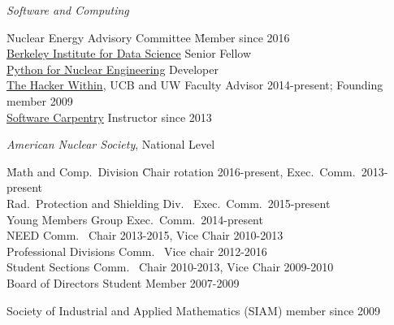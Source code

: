 \vspace*{-.5em}
\textit{Software and Computing}
\begin{tabbing}
\hspace*{2 em}\= Nuclear Energy Advisory Committee \hspace*{3em} \= Member since 2016\\
%
\>\href{http://bids.berkeley.edu/}{Berkeley Institute for Data Science} \> Senior Fellow\\
%
\> \href{http://pyne.io/}{Python for Nuclear Engineering}  \> Developer \\
%
\> \href{http://thehackerwithin.github.io/berkeley/}{The Hacker Within}, UCB and UW  \> Faculty Advisor 2014-present; Founding member 2009\\
%
\> \href{http://software-carpentry.org/}{Software Carpentry}  \> Instructor since 2013%
%
\end{tabbing}
%
\textit{American Nuclear Society}, National Level
\begin{tabbing}
\hspace*{2 em}\= Math and Comp.\ Division \hspace*{6em} \= Chair rotation 2016-present, Exec.\ Comm.\ 2013-present \\
%
\> Rad.\ Protection and Shielding Div.\ \> Exec.\ Comm.\ 2015-present\\
%
\> Young Members Group \> Exec.\ Comm.\ 2014-present\\
%
\> NEED Comm.\ \> Chair 2013-2015, Vice Chair 2010-2013\\
%
\> Professional Divisions Comm.\ \>	Vice chair 2012-2016 \\
%
\> Student Sections Comm.\ \> Chair 2010-2013, Vice Chair 2009-2010\\
%
%
\> Board of Directors \>	Student Member 2007-2009
%
\end{tabbing}

Society of Industrial and Applied Mathematics (SIAM) member since 2009 

